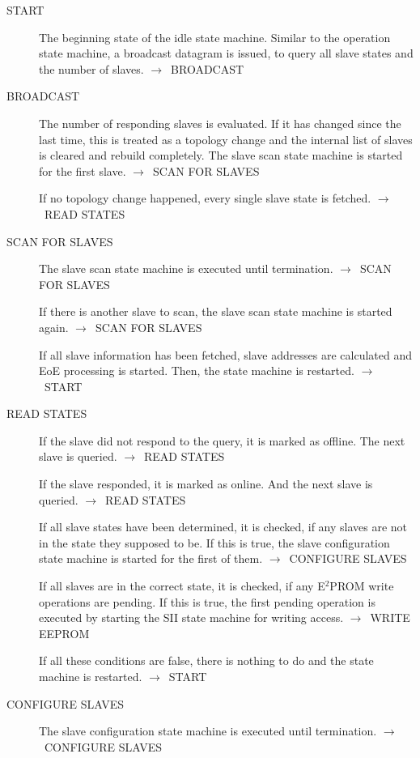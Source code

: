 \documentclass[a4paper,12pt,BCOR6mm,bibtotoc,idxtotoc]{scrbook}
\begin{document}
\begin{description}
\item[START] The beginning state of the idle state machine. Similar to
  the operation state machine, a broadcast datagram is issued, to
  query all slave states and the number of slaves.
  $\rightarrow$~BROADCAST

\item[BROADCAST] The number of responding slaves is evaluated. If it
  has changed since the last time, this is treated as a topology
  change and the internal list of slaves is cleared and rebuild
  completely. The slave scan state machine is started for the first
  slave. $\rightarrow$~SCAN FOR SLAVES

  If no topology change happened, every single slave state is fetched.
  $\rightarrow$~READ STATES

\item[SCAN FOR SLAVES] The slave scan state machine is executed until
  termination. $\rightarrow$~SCAN FOR SLAVES

  If there is another slave to scan, the slave scan state machine is
  started again. $\rightarrow$~SCAN FOR SLAVES

  If all slave information has been fetched, slave addresses are
  calculated and EoE processing is started. Then, the state machine is
  restarted. $\rightarrow$~START

\item[READ STATES] If the slave did not respond to the query, it is
  marked as offline. The next slave is queried.
  $\rightarrow$~READ STATES

  If the slave responded, it is marked as online. And the next slave
  is queried. $\rightarrow$~READ STATES

  If all slave states have been determined, it is checked, if any
  slaves are not in the state they supposed to be. If this is true,
  the slave configuration state machine is started for the first of
  them. $\rightarrow$~CONFIGURE SLAVES

  If all slaves are in the correct state, it is checked, if any
  E$^2$PROM write operations are pending. If this is true, the first
  pending operation is executed by starting the SII state machine for
  writing access. $\rightarrow$~WRITE EEPROM

  If all these conditions are false, there is nothing to do and the
  state machine is restarted. $\rightarrow$~START

\item[CONFIGURE SLAVES] The slave configuration state machine is
  executed until termination. $\rightarrow$~CONFIGURE SLAVES


\end{description}
\end{document}
